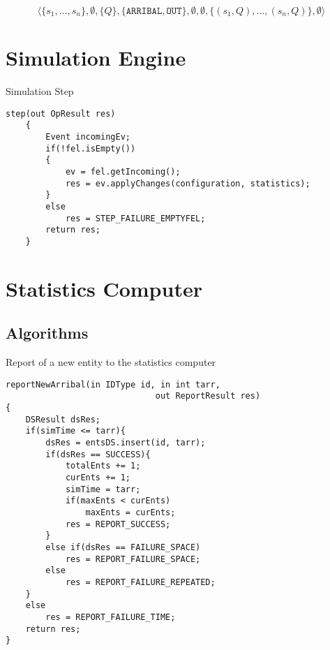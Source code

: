 \documentclass{article}
\begin{document}
\[
	\langle \{s_1, \ldots, s_n\}, \emptyset, \{Q\}, \{\mathtt{ARRIBAL}, \mathtt{OUT}\}, \emptyset, \emptyset, \{(s_1, Q), \ldots, (s_n, Q)\}, \emptyset \rangle
\]

\begin{center}
  \begin{prooftree}




  \end{prooftree}
\end{center}


\newpage
\section{Simulation Engine}

\begin{algorithm}[ht]
	\caption{Simulation Step}
	\begin{Verbatim}[tabsize = 4]
	step(out OpResult res)
	{
		Event incomingEv; 
		if(!fel.isEmpty())
		{
			ev = fel.getIncoming();
			res = ev.applyChanges(configuration, statistics);
		}
		else
			res = STEP_FAILURE_EMPTYFEL; 
		return res; 	
	}
	\end{Verbatim}
\end{algorithm}
\newpage

\section{Statistics Computer}
\subsection{Algorithms}
\begin{algorithm}[ht] 
\caption{Report of a new entity to the statistics computer}
\begin{Verbatim}[tabsize = 4]
reportNewArribal(in IDType id, in int tarr, 
							  out ReportResult res)
{
	DSResult dsRes;
	if(simTime <= tarr){
		dsRes = entsDS.insert(id, tarr); 
		if(dsRes == SUCCESS){
			totalEnts += 1;
			curEnts += 1; 
			simTime = tarr; 
			if(maxEnts < curEnts)
				maxEnts = curEnts; 
			res = REPORT_SUCCESS; 		
		}	
		else if(dsRes == FAILURE_SPACE)
			res = REPORT_FAILURE_SPACE;
		else 
			res = REPORT_FAILURE_REPEATED; 
	}
	else
		res = REPORT_FAILURE_TIME; 
	return res;
} 
\end{Verbatim} 
\label{alg:reportNewEntity}
\end{algorithm} 
\end{document}
